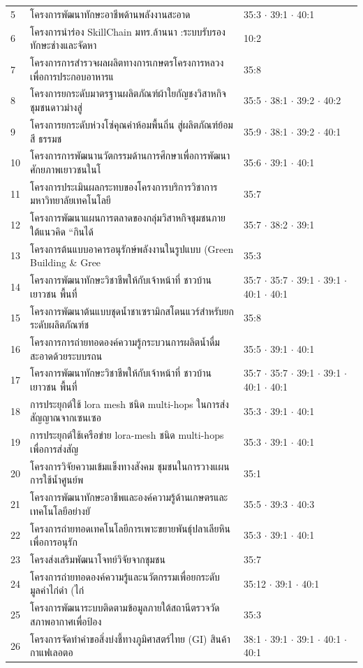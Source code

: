 {\begin{longtable}{@{}p{0.5cm}p{9.1cm}p{5.2cm}@{}}
5 & โครงการพัฒนาทักษะอาชีพด้านพลังงานสะอาด & 35:3 $\cdot$ 39:1 $\cdot$ 40:1\\
6 & โครงการนำร่อง SkillChain มทร.ล้านนา :ระบบรับรองทักษะช่างและจัดหา & 10:2\\
7 & โครงการการสำรวจผลผลิตทางการเกษตรโครงการหลวง เพื่อการประกอบอาหารแ & 35:8\\
8 & โครงการยกระดับมาตรฐานผลิตภัณฑ์ผ้าใยกัญชงวิสาหกิจชุมชนดาวม่างสู่ & 35:5 $\cdot$ 38:1 $\cdot$ 39:2 $\cdot$ 40:2\\
9 & โครงการยกระดับห่วงโซ่คุณค่าห้อมพื้นถิ่น สู่ผลิตภัณฑ์ย้อมสี ธรรมช & 35:9 $\cdot$ 38:1 $\cdot$ 39:2 $\cdot$ 40:1\\
10 & โครงการการพัฒนานวัตกรรมด้านการศึกษาเพื่อการพัฒนาศักยภาพเยาวชนในโ & 35:6 $\cdot$ 39:1 $\cdot$ 40:1\\
11 & โครงการประเมินผลกระทบของโครงการบริการวิชาการมหาวิทยาลัยเทคโนโลยี & 35:7\\
12 & โครงการพัฒนาแผนการตลาดของกลุ่มวิสาหกิจชุมชนภายใต้แนวคิด “กินได้ & 35:7 $\cdot$ 38:2 $\cdot$ 39:1\\
13 & โครงการต้นแบบอาคารอนุรักษ์พลังงานในรูปแบบ (Green Building \& Gree & 35:3\\
14 & โครงการพัฒนาทักษะวิชาชีพให้กับเจ้าหน้าที่ ชาวบ้าน เยาวชน พื้นที่ & 35:7 $\cdot$ 35:7 $\cdot$ 39:1 $\cdot$ 39:1 $\cdot$ 40:1 $\cdot$ 40:1\\
15 & โครงการพัฒนาต้นแบบชุดน้ำชาเซรามิกสโตนแวร์สำหรับยกระดับผลิตภัณฑ์ช & 35:8\\
16 & โครงการการถ่ายทอดองค์ความรู้กระบวนการผลิตน้ำดื่มสะอาดด้วยระบบรถน & 35:5 $\cdot$ 39:1 $\cdot$ 40:1\\
17 & โครงการพัฒนาทักษะวิชาชีพให้กับเจ้าหน้าที่ ชาวบ้าน เยาวชน พื้นที่ & 35:7 $\cdot$ 35:7 $\cdot$ 39:1 $\cdot$ 39:1 $\cdot$ 40:1 $\cdot$ 40:1\\
18 & การประยุกต์ใช้ lora mesh ชนิด multi-hops ในการส่งสัญญาณจากเซนเซอ & 35:3 $\cdot$ 39:1 $\cdot$ 40:1\\
19 & การประยุกต์ใช้เครือข่าย lora-mesh ชนิด multi-hops เพื่อการส่งสัญ & 35:3 $\cdot$ 39:1 $\cdot$ 40:1\\
20 & โครงการวิจัยความเข้มแข็งทางสังคม ชุมชนในการวางแผนการใช้น้ำศูนย์พ & 35:1\\
21 & โครงการพัฒนาทักษะอาชีพและองค์ความรู้ด้านเกษตรและเทคโนโลยีอย่างยั & 35:5 $\cdot$ 39:3 $\cdot$ 40:3\\
22 & โครงการถ่ายทอดเทคโนโลยีการเพาะขยายพันธุ์ปลาเลียหินเพื่อการอนุรัก & 35:3 $\cdot$ 39:1 $\cdot$ 40:1\\
23 & โครงส่งเสริมพัฒนาโจทย์วิจัยจากชุมชน & 35:7\\
24 & โครงการถ่ายทอดองค์ความรู้และนวัตกรรมเพื่อยกระดับมูลค่าไก่ดำ (ไก่ & 35:12 $\cdot$ 39:1 $\cdot$ 40:1\\
25 & โครงการพัฒนาระบบติดตามข้อมูลภายใต้สถานีตรวจวัดสภาพอากาศเพื่อป้อง & 35:3\\
26 & โครงการจัดทำคำขอสิ่งบ่งชี้ทางภูมิศาสตร์ไทย (GI) สินค้ากาแฟเลอตอ & 38:1 $\cdot$ 39:1 $\cdot$ 39:1 $\cdot$ 40:1 $\cdot$ 40:1\\
\midrule
\bottomrule
\end{longtable}
}
